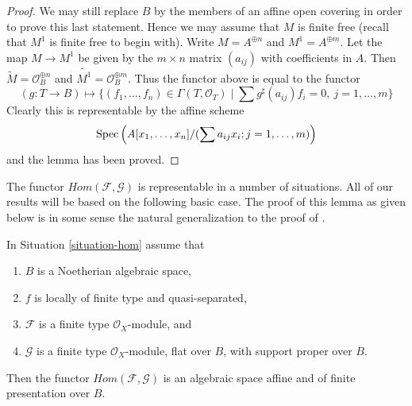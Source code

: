 \begin{proof}
\medskip\noindent
We may still replace $B$ by the members of an affine open covering
in order to prove this last statement. Hence we may assume that $M$
is finite free (recall that $M^1$ is finite free to begin with).
Write $M = A^{\oplus n}$ and $M^1 = A^{\oplus m}$. Let the map
$M \to M^1$ be given by the $m \times n$ matrix $(a_{ij})$ with
coefficients in $A$. Then $\widetilde{M} = \mathcal{O}_B^{\oplus n}$
and $\widetilde{M^1} = \mathcal{O}_B^{\oplus m}$. Thus the functor
above is equal to the functor
$$
(g : T \to B) \longmapsto
\{(f_1, \ldots, f_n) \in \Gamma(T, \mathcal{O}_T) \mid
\sum g^\sharp(a_{ij})f_i = 0,\ j = 1, \ldots, m\}
$$
Clearly this is representable by the affine scheme
$$
\mathop{\mathrm{Spec}}\left(A[x_1, \ldots, x_n]/(\sum a_{ij}x_i; j = 1, \ldots, m)\right)
$$
and the lemma has been proved.
\end{proof}

\noindent
The functor $\mathit{Hom}(\mathcal{F}, \mathcal{G})$ is representable in a
number of situations. All of our results will be based on the following
basic case. The proof of this lemma as given below is in some sense the
natural generalization to the proof of \cite[III, Cor 7.7.8]{EGA}.

\begin{lemma}
\label{lemma-noetherian-hom}
In Situation \ref{situation-hom} assume that
\begin{enumerate}
\item $B$ is a Noetherian algebraic space,
\item $f$ is locally of finite type and quasi-separated,
\item $\mathcal{F}$ is a finite type $\mathcal{O}_X$-module, and
\item $\mathcal{G}$ is a finite type $\mathcal{O}_X$-module, flat over $B$,
with support proper over $B$.
\end{enumerate}
Then the functor $\mathit{Hom}(\mathcal{F}, \mathcal{G})$ is
an algebraic space affine and of finite presentation over $B$.
\end{lemma}

